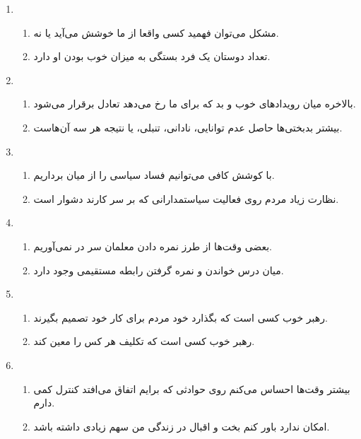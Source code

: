 \documentclass[a4paper,10pt]{article}
\begin{document}
\begin{enumerate}
 \item \begin{enumerate}
        \item مشکل می‌توان فهمید کسی واقعا از ما خوشش می‌آید یا نه.
	\item تعداد دوستان یک فرد بستگی به میزان خوب بودن او دارد.
       \end{enumerate}

\hdashline

 \item \begin{enumerate}
        \item بالاخره میان رویدادهای خوب و بد که برای ما رخ می‌دهد تعادل برقرار می‌شود.
	\item بیشتر بدبختی‌ها حاصل عدم توانایی، نادانی، تنبلی، یا نتیجه هر سه آن‌هاست.
       \end{enumerate}

\hdashline

 \item \begin{enumerate}
        \item با کوشش کافی می‌توانیم فساد سیاسی را از میان برداریم.
	\item نظارت زیاد مردم روی فعالیت سیاستمدارانی که بر سر کارند دشوار است.
       \end{enumerate}

\hdashline

 \item \begin{enumerate}
        \item بعضی وقت‌ها از طرز نمره دادن معلمان سر در نمی‌آوریم.
	\item میان درس خواندن و نمره گرفتن رابطه مستقیمی وجود دارد.
       \end{enumerate}

\hdashline

 \item \begin{enumerate}
        \item رهبر خوب کسی است که بگذارد خود مردم برای کار خود تصمیم بگیرند.
	\item رهبر خوب کسی است که تکلیف هر کس را معین کند.
       \end{enumerate}

\hdashline

\pagebreak

 \item \begin{enumerate}
        \item بیشتر وقت‌ها احساس می‌کنم روی حوادثی که برایم اتفاق می‌افتد کنترل کمی دارم.
	\item امکان ندارد باور کنم بخت و اقبال در زندگی من سهم زیادی داشته باشد.
       \end{enumerate}


\end{enumerate}
\end{document}

